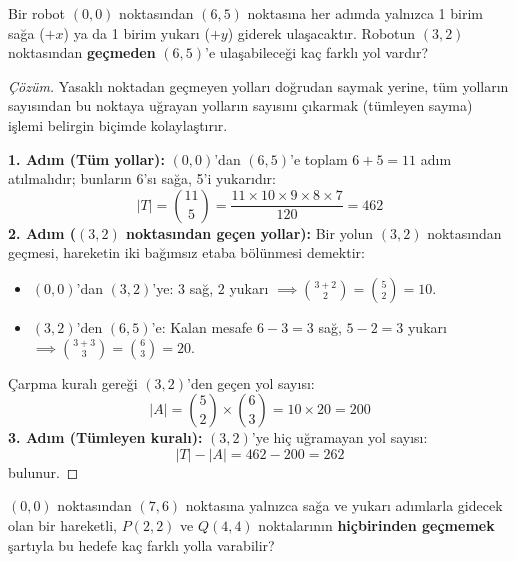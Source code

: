 \begin{example}
Bir robot $(0,0)$ noktasından $(6,5)$ noktasına her adımda yalnızca 1 birim sağa ($+x$) ya da 1 birim yukarı ($+y$) giderek ulaşacaktır. Robotun $(3,2)$ noktasından \textbf{geçmeden} $(6,5)$'e ulaşabileceği kaç farklı yol vardır?
\end{example}

\begin{proof}[Çözüm]
Yasaklı noktadan geçmeyen yolları doğrudan saymak yerine, tüm yolların sayısından bu noktaya uğrayan yolların sayısını çıkarmak (tümleyen sayma) işlemi belirgin biçimde kolaylaştırır.

\textbf{1. Adım (Tüm yollar):}
$(0,0)$'dan $(6,5)$'e toplam $6 + 5 = 11$ adım atılmalıdır; bunların 6'sı sağa, 5'i yukarıdır:
\[
|T| = \binom{11}{5} = \frac{11 \times 10 \times 9 \times 8 \times 7}{120} = 462
\]
\textbf{2. Adım ($(3,2)$ noktasından geçen yollar):}
Bir yolun $(3,2)$ noktasından geçmesi, hareketin iki bağımsız etaba bölünmesi demektir:
\begin{itemize}
    \item $(0,0)$'dan $(3,2)$'ye: $3$ sağ, $2$ yukarı $\implies \binom{3+2}{2} = \binom{5}{2} = 10$.
    \item $(3,2)$'den $(6,5)$'e: Kalan mesafe $6-3 = 3$ sağ, $5-2 = 3$ yukarı $\implies \binom{3+3}{3} = \binom{6}{3} = 20$.
\end{itemize}
Çarpma kuralı gereği $(3,2)$'den geçen yol sayısı:
\[
|A| = \binom{5}{2} \times \binom{6}{3} = 10 \times 20 = 200
\]
\textbf{3. Adım (Tümleyen kuralı):}
$(3,2)$'ye hiç uğramayan yol sayısı:
\[
|T| - |A| = 462 - 200 = 262
\]
bulunur.
\end{proof}

\begin{example}
$(0,0)$ noktasından $(7,6)$ noktasına yalnızca sağa ve yukarı adımlarla gidecek olan bir hareketli, $P(2,2)$ ve $Q(4,4)$ noktalarının \textbf{hiçbirinden geçmemek} şartıyla bu hedefe kaç farklı yolla varabilir?
\end{example}

